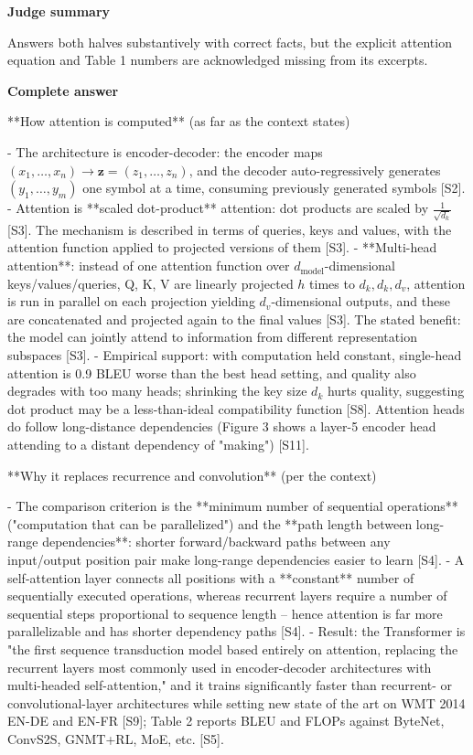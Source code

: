\documentclass[10pt]{article}
\begin{document}
\textbf{Judge summary}
\begin{EvidenceText}
Answers both halves substantively with correct facts, but the explicit attention equation and Table 1 numbers are acknowledged missing from its excerpts.
\end{EvidenceText}

\textbf{Complete answer}
\begin{AnswerText}
**How attention is computed** (as far as the context states)

- The architecture is encoder-decoder: the encoder maps $(x_1,\dots,x_n)\to \mathbf{z}=(z_1,\dots,z_n)$, and the decoder auto-regressively generates $(y_1,\dots,y_m)$ one symbol at a time, consuming previously generated symbols [S2].
- Attention is **scaled dot-product** attention: dot products are scaled by $\frac{1}{\sqrt{d_k}}$ [S3]. The mechanism is described in terms of queries, keys and values, with the attention function applied to projected versions of them [S3].
- **Multi-head attention**: instead of one attention function over $d_{\text{model}}$-dimensional keys/values/queries, Q, K, V are linearly projected $h$ times to $d_k,d_k,d_v$, attention is run in parallel on each projection yielding $d_v$-dimensional outputs, and these are concatenated and projected again to the final values [S3]. The stated benefit: the model can jointly attend to information from different representation subspaces [S3].
- Empirical support: with computation held constant, single-head attention is 0.9 BLEU worse than the best head setting, and quality also degrades with too many heads; shrinking the key size $d_k$ hurts quality, suggesting dot product may be a less-than-ideal compatibility function [S8]. Attention heads do follow long-distance dependencies (Figure 3 shows a layer-5 encoder head attending to a distant dependency of "making") [S11].

**Why it replaces recurrence and convolution** (per the context)

- The comparison criterion is the **minimum number of sequential operations** ("computation that can be parallelized") and the **path length between long-range dependencies**: shorter forward/backward paths between any input/output position pair make long-range dependencies easier to learn [S4].
- A self-attention layer connects all positions with a **constant** number of sequentially executed operations, whereas recurrent layers require a number of sequential steps proportional to sequence length -- hence attention is far more parallelizable and has shorter dependency paths [S4].
- Result: the Transformer is "the first sequence transduction model based entirely on attention, replacing the recurrent layers most commonly used in encoder-decoder architectures with multi-headed self-attention," and it trains significantly faster than recurrent- or convolutional-layer architectures while setting new state of the art on WMT 2014 EN-DE and EN-FR [S9]; Table 2 reports BLEU and FLOPs against ByteNet, ConvS2S, GNMT+RL, MoE, etc. [S5].


\end{AnswerText}
\end{document}
